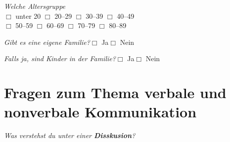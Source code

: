 \documentclass[a4paper,12pt]{scrartcl}
\newcommand{\checkbox}{\(\Box\)}
\newcommand{\hfilloutline}[1]{\rule{#1}{0.5pt}}
\newcommand{\frage}[1]{\textit{#1}}
\renewcommand{\emph}[1]{\textbf{#1}}
\begin{document}
\frage{Welche Altersgruppe}\\
\checkbox{} unter 20 \hfill
\checkbox{} 20--29 \hfill
\checkbox{} 30--39 \hfill
\checkbox{} 40--49 \\
\checkbox{} 50--59 \hfill
\checkbox{} 60--69 \hfill
\checkbox{} 70--79 \hfill
\checkbox{} 80--89

\frage{Gibt es eine eigene Familie?}\hfill \checkbox{} Ja\hspace{0.8cm}\checkbox{} Nein\par
\frage{Falls ja, sind Kinder in der Familie?}\hfill \checkbox{} Ja\hspace{0.8cm}\checkbox{} Nein
\newpage






\section*{Fragen zum Thema verbale und nonverbale Kommunikation}

\frage{Was verstehst du unter einer \emph{Disskusion}?}
\vspace{3cm}
\end{document}
